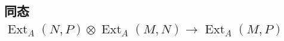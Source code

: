 \chapter{}
\section{同态 \texorpdfstring{$\operatorname{Ext}_{A}(N,P)\otimes\operatorname{Ext}_{A}(M,N)\to\operatorname{Ext}_{A}(M,P)$}{ExtA(N,P)@ExtA(M,N)->ExtA(M,P)}}
